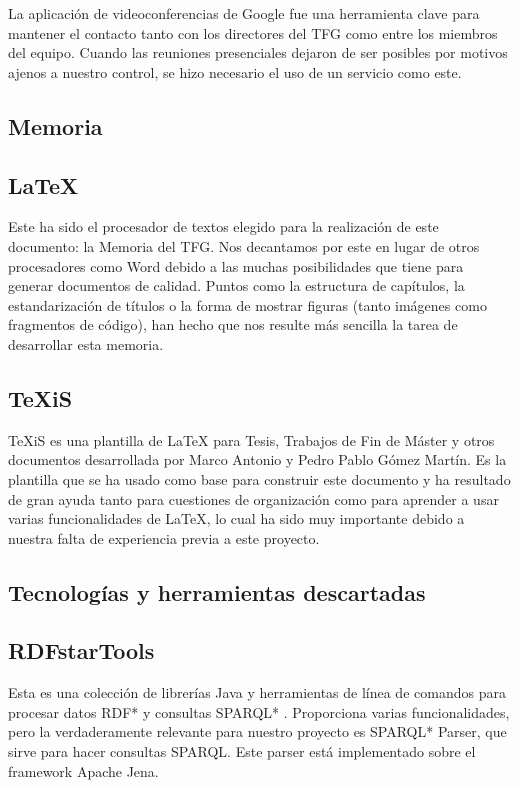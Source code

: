 La aplicación de videoconferencias de Google fue una herramienta clave para mantener el contacto tanto con los directores del TFG como entre los miembros del equipo. Cuando las reuniones presenciales dejaron de ser posibles por motivos ajenos a nuestro control, se hizo necesario el uso de un servicio como este.

\subsection{Memoria}

\subsection*{LaTeX}

Este ha sido el procesador de textos elegido para la realización de este documento: la Memoria del TFG. Nos decantamos por este en lugar de otros procesadores como Word debido a las muchas posibilidades que tiene para generar documentos de calidad. Puntos como la estructura de capítulos, la estandarización de títulos o la forma de mostrar figuras (tanto imágenes como fragmentos de código), han hecho que nos resulte más sencilla la tarea de desarrollar esta memoria.

\subsection*{TeXiS}

TeXiS es una plantilla de LaTeX para Tesis, Trabajos de Fin de Máster y otros documentos desarrollada por Marco Antonio y Pedro Pablo Gómez Martín. Es la plantilla que se ha usado como base para construir este documento y ha resultado de gran ayuda tanto para cuestiones de organización como para aprender a usar varias funcionalidades de LaTeX, lo cual ha sido muy importante debido a nuestra falta de experiencia previa a este proyecto.

\subsection{Tecnologías y herramientas descartadas}

\subsection*{RDFstarTools}

Esta es una colección de librerías Java y herramientas de línea de comandos para procesar datos RDF* y consultas SPARQL* \cite{rdfstartools}. Proporciona varias funcionalidades, pero la verdaderamente relevante para nuestro proyecto es SPARQL* Parser, que sirve para hacer consultas SPARQL. Este parser está implementado sobre el framework Apache Jena.\\



